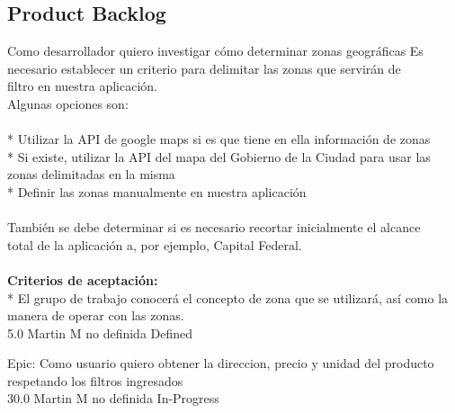\vspace{20pt}

\subsection{Product Backlog}
	{Como desarrollador quiero investigar cómo determinar zonas geográficas} %
	{Es necesario establecer un criterio para delimitar las zonas que servirán de\\
filtro en nuestra aplicación.\\
Algunas opciones son:\\
  \\
* Utilizar la API de google maps si es que tiene en ella información de zonas\\
* Si existe, utilizar la API del mapa del Gobierno de la Ciudad para usar las zonas delimitadas en la misma\\
* Definir las zonas manualmente en nuestra aplicación\\
  \\
También se debe determinar si es necesario recortar inicialmente el alcance\\
total de la aplicación a, por ejemplo, Capital Federal.\\
  \\
\textbf{Criterios de aceptación:}\\
* El grupo de trabajo conocerá el concepto de zona que se utilizará, así como la manera de operar con las zonas.  \\
} %
	{} %
	{5.0} %
	{Martin M} %
	{no definida} %
	{Defined} %


\vspace{20pt}

	{Epic: Como usuario quiero obtener la direccion, precio y unidad del producto respetando los filtros ingresados} %
	{\\
} %
	{} %
	{30.0} %
	{Martin M} %
	{no definida} %
	{In-Progress} %


\vspace{20pt}

